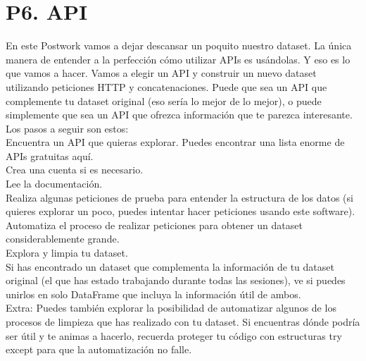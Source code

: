 \documentclass{article}
\begin{document}
\section{P6. API}
En este Postwork vamos a dejar descansar un poquito nuestro dataset. La única manera de entender a la perfección cómo utilizar APIs es usándolas. Y eso es lo que vamos a hacer. Vamos a elegir un API y construir un nuevo dataset utilizando peticiones HTTP y concatenaciones. Puede que sea un API que complemente tu dataset original (eso sería lo mejor de lo mejor), o puede simplemente que sea un API que ofrezca información que te parezca interesante. Los pasos a seguir son estos:\\
Encuentra un API que quieras explorar. Puedes encontrar una lista enorme de APIs gratuitas aquí.\\
Crea una cuenta si es necesario.\\
Lee la documentación.\\
Realiza algunas peticiones de prueba para entender la estructura de los datos (si quieres explorar un poco, puedes intentar hacer peticiones usando este software).\\
Automatiza el proceso de realizar peticiones para obtener un dataset considerablemente grande.\\
Explora y limpia tu dataset.\\
Si has encontrado un dataset que complementa la información de tu dataset original (el que has estado trabajando durante todas las sesiones), ve si puedes unirlos en solo DataFrame que incluya la información útil de ambos.\\
Extra: Puedes también explorar la posibilidad de automatizar algunos de los procesos de limpieza que has realizado con tu dataset. Si encuentras dónde podría ser útil y te animas a hacerlo, recuerda proteger tu código con estructuras try except para que la automatización no falle.
\end{document}
